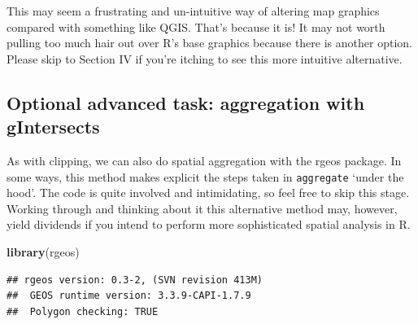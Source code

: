 \documentclass[]{article}
\newenvironment{Shaded}{}{}
\newcommand{\KeywordTok}[1]{\textcolor[rgb]{0.00,0.44,0.13}{\textbf{{#1}}}}
\newcommand{\DataTypeTok}[1]{\textcolor[rgb]{0.56,0.13,0.00}{{#1}}}
\newcommand{\DecValTok}[1]{\textcolor[rgb]{0.25,0.63,0.44}{{#1}}}
\newcommand{\StringTok}[1]{\textcolor[rgb]{0.25,0.44,0.63}{{#1}}}
\newcommand{\CommentTok}[1]{\textcolor[rgb]{0.38,0.63,0.69}{\textit{{#1}}}}
\newcommand{\OtherTok}[1]{\textcolor[rgb]{0.00,0.44,0.13}{{#1}}}
\newcommand{\NormalTok}[1]{{#1}}
\begin{document}
This may seem a frustrating and un-intuitive way of altering map
graphics compared with something like QGIS. That's because it is! It may
not worth pulling too much hair out over R's base graphics because there
is another option. Please skip to Section IV if you're itching to see
this more intuitive alternative.

\subsection{Optional advanced task: aggregation with
gIntersects}\label{optional-advanced-task-aggregation-with-gintersects}

As with clipping, we can also do spatial aggregation with the rgeos
package. In some ways, this method makes explicit the steps taken in
\texttt{aggregate} `under the hood'. The code is quite involved and
intimidating, so feel free to skip this stage. Working through and
thinking about it this alternative method may, however, yield dividends
if you intend to perform more sophisticated spatial analysis in R.

\begin{Shaded}
\begin{Highlighting}[]
\KeywordTok{library}\NormalTok{(rgeos)}
\end{Highlighting}
\end{Shaded}

\begin{verbatim}
## rgeos version: 0.3-2, (SVN revision 413M)
##  GEOS runtime version: 3.3.9-CAPI-1.7.9 
##  Polygon checking: TRUE
\end{verbatim}

\begin{Shaded}
\end{Shaded}
\end{document}
